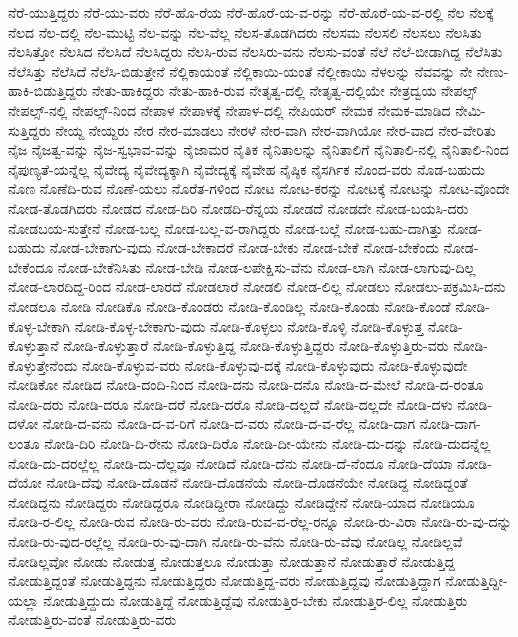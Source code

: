 {ನೆರೆ-ಯುತ್ತಿದ್ದರು
ನೆರೆ-ಯು-ವರು
ನೆರೆ-ಹೊ-ರೆಯ
ನೆರೆ-ಹೊರೆ-ಯ-ವ-ರನ್ನು
ನೆರೆ-ಹೊರೆ-ಯ-ವ-ರಲ್ಲಿ
ನೆಲ
ನೆಲಕ್ಕೆ
ನೆಲದ
ನೆಲ-ದಲ್ಲಿ
ನೆಲ-ಮುಟ್ಟಿ
ನೆಲ-ವನ್ನು
ನೆಲ-ವೆಲ್ಲ
ನೆಲಸ-ತೊಡಗಿದರು
ನೆಲಸಮ
ನೆಲಸಲಿ
ನೆಲಸಲು
ನೆಲಸಿತು
ನೆಲಸಿತ್ತೋ
ನೆಲಸಿದ
ನೆಲಸಿದೆ
ನೆಲಸಿದ್ದರು
ನೆಲಸಿ-ರುವ
ನೆಲಸಿರು-ವನು
ನೆಲಸು-ವಂತೆ
ನೆಲೆ
ನೆಲೆ-ಬೀಡಾಗಿದ್ದ
ನೆಲೆಸಿತು
ನೆಲೆಸಿತ್ತು
ನೆಲೆಸಿದೆ
ನೆಲೆಸಿ-ಬಿಡುತ್ತೇನೆ
ನೆಲ್ಲಿಕಾಯಂತೆ
ನೆಲ್ಲಿಕಾಯಿ-ಯಂತೆ
ನೆಲ್ಲೀಕಾಯಿ
ನೆಳಲನ್ನು
ನೆವವನ್ನು
ನೇ
ನೇಣು-ಹಾಕಿ-ಬಿಡುತ್ತಿದ್ದರು
ನೇತು-ಹಾಕಿದ್ದರು
ನೇತು-ಹಾಕಿ-ರುವ
ನೇತೃತ್ವ-ದಲ್ಲಿ
ನೇತೃತ್ವ-ದಲ್ಲಿಯೇ
ನೇತ್ರದ್ವಯ
ನೇಪಲ್ಸ್
ನೇಪಲ್ಸ್-ನಲ್ಲಿ
ನೇಪಲ್ಸ್-ನಿಂದ
ನೇಪಾಳ
ನೇಪಾಳಕ್ಕೆ
ನೇಪಾಳ-ದಲ್ಲಿ
ನೇಪಿಯರ್
ನೇಮಕ
ನೇಮಕ-ಮಾಡಿದ
ನೇಮಿ-ಸುತ್ತಿದ್ದರು
ನೇಯ್ದ
ನೇಯ್ದರು
ನೇರ
ನೇರ-ಮಾಡಲು
ನೇರಳೆ
ನೇರ-ವಾಗಿ
ನೇರ-ವಾಗಿಯೋ
ನೇರ-ವಾದ
ನೇರ-ವೇರಿತು
ನೈಜ
ನೈಜತ್ವ-ವನ್ನು
ನೈಜ-ಸ್ವಭಾವ-ವನ್ನು
ನೈಜಾಮರ
ನೈತಿಕ
ನೈನಿತಾಲನ್ನು
ನೈನಿತಾಲಿಗೆ
ನೈನಿತಾಲಿ-ನಲ್ಲಿ
ನೈನಿತಾಲಿ-ನಿಂದ
ನೈಪುಣ್ಯತೆ-ಯನ್ನೆಲ್ಲ
ನೈವೇದ್ಯ
ನೈವೇದ್ಯಕ್ಕಾಗಿ
ನೈವೇದ್ಯಕ್ಕೆ
ನೈವೇಹ
ನೈಷ್ಠಿಕ
ನೈಸರ್ಗಿಕ
ನೊಂದ-ವರು
ನೊಡ-ಬಹುದು
ನೊಣ
ನೊಣೆದಿ-ರುವ
ನೊಣೆ-ಯಲು
ನೊರೆತ-ಗಳಿಂದ
ನೋಟ
ನೋಟ-ಕರನ್ನು
ನೋಟಕ್ಕೆ
ನೋಟನ್ನು
ನೋಟ-ವೊಂದೇ
ನೋಡ-ತೊಡಗಿದರು
ನೋಡದ
ನೋಡ-ದಿರಿ
ನೋಡದಿ-ರೆನ್ನಯ
ನೋಡದೆ
ನೋಡದೇ
ನೋಡ-ಬಯಸಿ-ದರು
ನೋಡಬಯ-ಸುತ್ತೇನೆ
ನೋಡ-ಬಲ್ಲ
ನೋಡ-ಬಲ್ಲ-ವ-ರಾಗಿದ್ದರು
ನೋಡ-ಬಲ್ಲೆ
ನೋಡ-ಬಹು-ದಾಗಿತ್ತು
ನೋಡ-ಬಹುದು
ನೋಡ-ಬೇಕಾಗು-ವುದು
ನೋಡ-ಬೇಕಾದರೆ
ನೋಡ-ಬೇಕು
ನೋಡ-ಬೇಕೆ
ನೋಡ-ಬೇಕೆಂದು
ನೋಡ-ಬೇಕೆಂದೂ
ನೋಡ-ಬೇಕೆನಿಸಿತು
ನೋಡ-ಬೇಡಿ
ನೋಡ-ಲಪೇಕ್ಷಿಸು-ವೆನು
ನೋಡ-ಲಾಗಿ
ನೋಡ-ಲಾಗುವು-ದಿಲ್ಲ
ನೋಡ-ಲಾರದಿದ್ದ-ರಿಂದ
ನೋಡ-ಲಾರದೆ
ನೋಡಲಾರೆ
ನೋಡಲಿ
ನೋಡ-ಲಿಲ್ಲ
ನೋಡಲು
ನೋಡಲು-ಪಕ್ರಮಿಸಿ-ದನು
ನೋಡಲೂ
ನೋಡಿ
ನೋಡಿಕೊ
ನೋಡಿ-ಕೊಂಡರು
ನೋಡಿ-ಕೊಂಡಿಲ್ಲ
ನೋಡಿ-ಕೊಂಡು
ನೋಡಿ-ಕೊಂಡೆ
ನೋಡಿ-ಕೊಳ್ಳ-ಬೇಕಾಗಿ
ನೋಡಿ-ಕೊಳ್ಳ-ಬೇಕಾಗು-ವುದು
ನೋಡಿ-ಕೊಳ್ಳಲು
ನೋಡಿ-ಕೊಳ್ಳಿ
ನೋಡಿ-ಕೊಳ್ಳುತ್ತ
ನೋಡಿ-ಕೊಳ್ಳುತ್ತಾನೆ
ನೋಡಿ-ಕೊಳ್ಳುತ್ತಾರೆ
ನೋಡಿ-ಕೊಳ್ಳುತ್ತಿದ್ದ
ನೋಡಿ-ಕೊಳ್ಳುತ್ತಿದ್ದರು
ನೋಡಿ-ಕೊಳ್ಳುತ್ತಿರು-ವರು
ನೋಡಿ-ಕೊಳ್ಳುತ್ತೇನೆಂದು
ನೋಡಿ-ಕೊಳ್ಳುವ-ವರು
ನೋಡಿ-ಕೊಳ್ಳುವು-ದಕ್ಕೆ
ನೋಡಿ-ಕೊಳ್ಳುವುದು
ನೋಡಿ-ಕೊಳ್ಳುವುದೇ
ನೋಡಿಕೋ
ನೋಡಿದ
ನೋಡಿ-ದಂದಿ-ನಿಂದ
ನೋಡಿ-ದನು
ನೋಡಿ-ದನೊ
ನೋಡಿ-ದ-ಮೇಲೆ
ನೋಡಿ-ದ-ರಂತೂ
ನೋಡಿ-ದರು
ನೋಡಿ-ದರೂ
ನೋಡಿ-ದರೆ
ನೋಡಿ-ದರೊ
ನೋಡಿ-ದಲ್ಲದೆ
ನೋಡಿ-ದಲ್ಲದೇ
ನೋಡಿ-ದಳು
ನೋಡಿ-ದಳೋ
ನೋಡಿ-ದ-ವನು
ನೋಡಿ-ದ-ವ-ರಿಗೆ
ನೋಡಿ-ದ-ವರು
ನೋಡಿ-ದ-ವ-ರೆಲ್ಲ
ನೋಡಿ-ದಾಗ
ನೋಡಿ-ದಾಗ-ಲಂತೂ
ನೋಡಿ-ದಿರಿ
ನೋಡಿ-ದಿ-ರೇನು
ನೋಡಿ-ದಿರೊ
ನೋಡಿ-ದೀ-ಯೇನು
ನೋಡಿ-ದು-ದನ್ನು
ನೋಡಿ-ದುದನ್ನೆಲ್ಲ
ನೋಡಿ-ದು-ದರಲ್ಲೆಲ್ಲ
ನೋಡಿ-ದು-ದೆಲ್ಲವೂ
ನೋಡಿದೆ
ನೋಡಿ-ದೆನು
ನೋಡಿ-ದೆ-ನೆಂದೂ
ನೋಡಿ-ದೆಯಾ
ನೋಡಿ-ದೆಯೋ
ನೋಡಿ-ದೆವು
ನೋಡಿ-ದೊಡನೆ
ನೋಡಿ-ದೊಡನೆಯೆ
ನೋಡಿ-ದೊಡನೆಯೇ
ನೋಡಿದ್ದ
ನೋಡಿದ್ದಂತೆ
ನೋಡಿದ್ದನು
ನೋಡಿದ್ದರು
ನೋಡಿದ್ದರೂ
ನೋಡಿದ್ದೀರಾ
ನೋಡಿದ್ದು
ನೋಡಿದ್ದೇನೆ
ನೋಡಿ-ಯಾದ
ನೋಡಿಯೂ
ನೋಡಿ-ರ-ಲಿಲ್ಲ
ನೋಡಿ-ರುವ
ನೋಡಿ-ರು-ವರು
ನೋಡಿ-ರುವ-ವ-ರೆಲ್ಲ-ರನ್ನೂ
ನೋಡಿ-ರು-ವಿರಾ
ನೋಡಿ-ರು-ವು-ದನ್ನು
ನೋಡಿ-ರು-ವುದ-ರಲ್ಲೆಲ್ಲ
ನೋಡಿ-ರು-ವು-ದಾಗಿ
ನೋಡಿ-ರು-ವೆನು
ನೋಡಿ-ರು-ವೆವು
ನೋಡಿಲ್ಲ
ನೋಡಿಲ್ಲವೆ
ನೋಡಿಲ್ಲವೋ
ನೋಡು
ನೋಡುತ್ತ
ನೋಡುತ್ತಲೂ
ನೋಡುತ್ತಾ
ನೋಡುತ್ತಾನೆ
ನೋಡುತ್ತಾರೆ
ನೋಡುತ್ತಿದ್ದ
ನೋಡುತ್ತಿದ್ದಂತೆ
ನೋಡುತ್ತಿದ್ದನು
ನೋಡುತ್ತಿದ್ದರು
ನೋಡುತ್ತಿದ್ದ-ವರು
ನೋಡುತ್ತಿದ್ದವು
ನೋಡುತ್ತಿದ್ದಾಗ
ನೋಡುತ್ತಿದ್ದೀ-ಯಲ್ಲಾ
ನೋಡುತ್ತಿದ್ದುದು
ನೋಡುತ್ತಿದ್ದೆ
ನೋಡುತ್ತಿದ್ದೆವು
ನೋಡುತ್ತಿರ-ಬೇಕು
ನೋಡುತ್ತಿರ-ಲಿಲ್ಲ
ನೋಡುತ್ತಿರು
ನೋಡುತ್ತಿರು-ವಂತೆ
ನೋಡುತ್ತಿರು-ವರು
}
